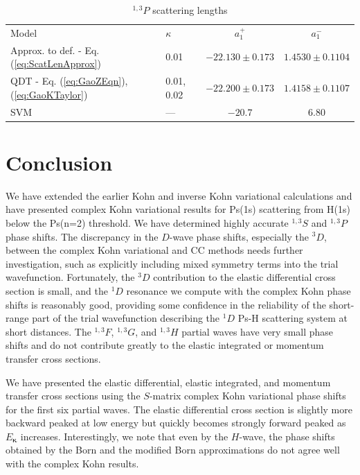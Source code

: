 \documentclass[preprint,showpacs,showkeys,preprintnumbers,amsmath,amssymb,longbibliography,pra,aps]{revtex4-1}
\begin{document}
{\begin{table}[H]
\begin{center}
\begin{ruledtabular}
\begin{tabular}{l l c c}
Model & $\kappa$ & $a_1^+$ & $a_1^-$ \\
\colrule
Approx. to def. - Eq. (\ref{eq:ScatLenApprox}) & 0.01 & $-22.130 \pm 0.173$ & $1.4530 \pm 0.1104$ \\
QDT - Eq. (\ref{eq:GaoZEqn}), (\ref{eq:GaoKTaylor}) & 0.01, 0.02 & $-22.200 \pm 0.173$ & $1.4158 \pm 0.1107$ \\
\colrule
SVM \cite{Ivanov2002} & --- & $-20.7$ & $6.80$ 
\end{tabular}
\end{ruledtabular}
\caption{$^{1,3}P$ scattering lengths}
\label{tab:PWaveScatLen}
\end{center}
\end{table}


\section{Conclusion}
We have extended the earlier Kohn 
and inverse Kohn variational calculations \cite{VanReeth2003,VanReeth2004}
and have presented complex Kohn variational results for Ps(1s) scattering from H(1s)
below the Ps(n=2) threshold.
We have determined highly accurate $^{1,3}S$ and $^{1,3}P$ phase shifts.
The discrepancy in the $D$-wave phase shifts, especially the $^3D$, between the 
complex Kohn variational and CC methods needs further investigation, such as 
explicitly including mixed symmetry terms into the trial wavefunction.
Fortunately, the $^3D$ contribution to the elastic differential 
cross section is small, and the $^1D$ resonance we compute with the complex Kohn 
phase shifts is reasonably good, providing some confidence in the reliability 
of the short-range part of the trial wavefunction describing the $^1D$ Ps-H 
scattering system at short distances. The $^{1,3}F$, $^{1,3}G$, and $^{1,3}H$ partial
waves have very small phase shifts and do not contribute greatly to the
elastic integrated or momentum transfer cross sections.

We have presented the elastic differential, elastic integrated, and momentum 
transfer cross sections using the $S$-matrix 
complex Kohn variational phase shifts for the first six partial waves.
The elastic differential cross section is slightly more backward peaked at
low energy but quickly becomes strongly forward peaked as $E_{\bm \kappa}$
increases.
Interestingly, we note that even by the $H$-wave, the phase shifts obtained 
by the Born and the modified Born approximations do not agree well with the 
complex Kohn results.

}
\end{document}
